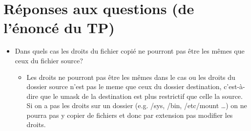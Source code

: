 %
\section{Réponses aux questions (de l'énoncé du TP)}
\begin{frame}{\secname}
%

\begin{itemize}
    \item Dans quels cas les droits du fichier copié ne pourront pas être les mêmes que ceux du fichier source?
    \vspace{0.3cm} 
    \begin{itemize}
        \item  Les droits ne pourront pas être les mêmes dans le cas ou les droits du dossier source n'est pas le
        meme que ceux du dossier destination, c'est-à-dire que le umask de la destination est plus restrictif
        que celle la source.
        Si on a pas les droits sur un dossier (e.g. /sys, /bin, /etc/mount \ldots) on ne pourra pas y copier de fichiers
        et donc par extension pas modifier les droits.
    \end{itemize}
   
\end{itemize}

\end{frame}
